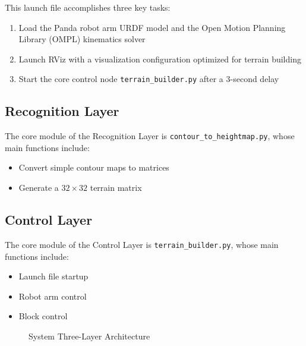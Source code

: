 \documentclass[12pt, a4paper]{article}
\begin{document}
This launch file accomplishes three key tasks:
\begin{enumerate}
    \item Load the Panda robot arm URDF model and the Open Motion Planning Library (OMPL) kinematics solver
    \item Launch RViz with a visualization configuration optimized for terrain building
    \item Start the core control node \texttt{terrain\_builder.py} after a 3-second delay
\end{enumerate}

\subsection{Recognition Layer}

The core module of the Recognition Layer is \texttt{contour\_to\_heightmap.py}, whose main functions include:

\begin{itemize}
    \item Convert simple contour maps to matrices
    \item Generate a $32 \times 32$ terrain matrix
\end{itemize}

\subsection{Control Layer}

The core module of the Control Layer is \texttt{terrain\_builder.py}, whose main functions include:

\begin{itemize}
    \item Launch file startup
    \item Robot arm control
    \item Block control
\end{itemize}

\begin{figure}[H]
    \centering
    \caption{System Three-Layer Architecture}
    \label{fig:architecture}
\end{figure}
\end{document}
